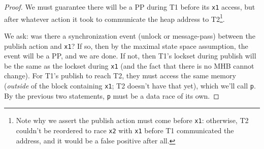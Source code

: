 \begin{proof}
We must guarantee there will be a PP during T1 before its {\tt x1} access, but after whatever action it took to communicate the heap address to T2\footnote{
Note why we assert the publish action must come before {\tt x1}: otherwise, T2 couldn't be reordered to race {\tt x2} with {\tt x1} before T1 communicated the address, and it would be a false positive after all.}.


We ask: was there a synchronization event (unlock or message-pass) between the publish action and {\tt x1}?
If so, then by the maximal state space assumption, the event will be a PP, and we are done.
If not, then  T1's lockset during publish will be the same as the lockset during {\tt x1} (and the fact that there is no MHB cannot change).
For T1's publish to reach T2, they must access the same memory ({\em outside} of the block containing {\tt x1}; T2 doesn't have that yet),
which we'll call {\tt p}.
By the previous two statements, {\tt p} must be a data race of its own.


\end{proof}
